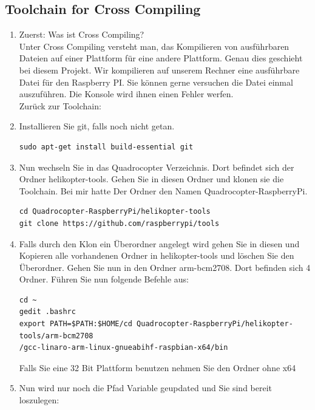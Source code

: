 \documentclass{article}
\begin{document}
\subsection{Toolchain for Cross Compiling}
\begin{enumerate}
\item[] Zuerst: Was ist Cross Compiling?\\
Unter Cross Compiling versteht man, das Kompilieren von ausführbaren Dateien auf einer Plattform für eine andere Plattform.
Genau dies geschieht bei diesem Projekt. Wir kompilieren auf unserem Rechner eine ausführbare Datei für den Raspberry PI. Sie können gerne versuchen die Datei einmal auszuführen. Die Konsole wird ihnen einen Fehler werfen.\\

Zurück zur Toolchain:\\

\item Installieren Sie git, falls noch nicht getan.
\begin{verbatim}
sudo apt-get install build-essential git
\end{verbatim}

\item Nun wechseln Sie in das Quadrocopter Verzeichnis. Dort befindet sich der Ordner helikopter-tools. Gehen Sie in diesen Ordner und klonen sie die Toolchain. Bei mir hatte Der Ordner den Namen Quadrocopter-RaspberryPi. 

\begin{verbatim}
cd Quadrocopter-RaspberryPi/helikopter-tools
git clone https://github.com/raspberrypi/tools
\end{verbatim}

\item Falls durch den Klon ein Überordner angelegt wird gehen Sie in diesen und Kopieren alle vorhandenen Ordner in helikopter-tools und löschen Sie den Überordner. Gehen Sie nun in den Ordner arm-bcm2708. Dort befinden sich 4 Ordner. Führen Sie nun folgende Befehle aus:\\

\begin{verbatim}
cd ~
gedit .bashrc
export PATH=$PATH:$HOME/cd Quadrocopter-RaspberryPi/helikopter-tools/arm-bcm2708
/gcc-linaro-arm-linux-gnueabihf-raspbian-x64/bin
\end{verbatim}
Falls Sie eine 32 Bit Plattform benutzen nehmen Sie den Ordner ohne x64\\

\item Nun wird nur noch die Pfad Variable geupdated und Sie sind bereit loszulegen:\\


\end{enumerate}
\end{document}
